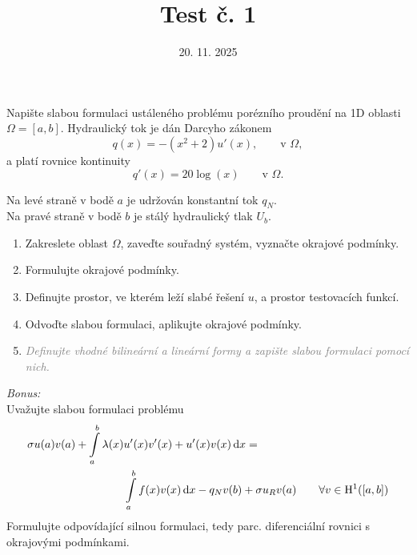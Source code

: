 \documentclass{article}
\def\d{{\rm{d}}}
\begin{document}
\title{Test č. 1}
\date{20. 11. 2025}
\author{}
\maketitle


\noindent

Napište slabou formulaci ustáleného problému porézního proudění na 1D oblasti $\Omega=[a,b]$.
Hydraulický tok je dán Darcyho zákonem
\[
    q(x) = -(x^2+2)u'(x), \qquad \textrm{v }\Omega,
\]
a platí rovnice kontinuity
\[
    q'(x) = 20\log(x) \qquad \textrm{v }\Omega.
\]

\noindent
Na levé straně v bodě $a$ je udržován konstantní tok $q_N$.\\
Na pravé straně v bodě $b$ je stálý hydraulický tlak $U_b$.

\begin{enumerate}
\item Zakreslete oblast $\Omega$, zaveďte souřadný systém, vyznačte okrajové podmínky.
\item Formulujte okrajové podmínky.
\item Definujte prostor, ve kterém leží slabé řešení $u$, a prostor testovacích funkcí.
\item Odvoďte slabou formulaci, aplikujte okrajové podmínky.
\item \textit{\textcolor{gray}{Definujte vhodné bilineární a lineární formy a zapište slabou formulaci pomocí nich.}}
\end{enumerate}


\vspace{2cm}
\emph{Bonus:}\\
Uvažujte slabou formulaci problému
\begin{align*}
    \sigma u(a)v(a) + \int\limits_{a}^{b} \lambda(x) & u'(x)v'(x) + u'(x)v(x) \,\d x = \\
        &\int\limits_{a}^{b} f(x)v(x) \,\d x - q_Nv(b) + \sigma u_R v(a) \qquad \forall v\in \mathrm{H}^1([a,b])
\end{align*}
Formulujte odpovídající silnou formulaci, tedy parc. diferenciální rovnici s okrajovými podmínkami.
\end{document}
